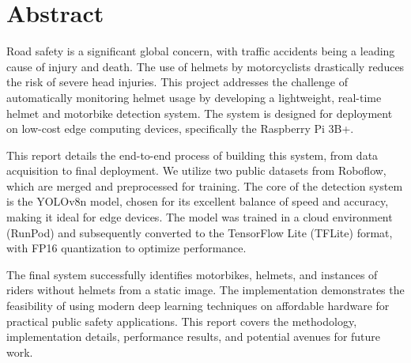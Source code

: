 \chapter*{Abstract}
Road safety is a significant global concern, with traffic accidents being a leading cause of injury and death. The use of helmets by motorcyclists drastically reduces the risk of severe head injuries. This project addresses the challenge of automatically monitoring helmet usage by developing a lightweight, real-time helmet and motorbike detection system. The system is designed for deployment on low-cost edge computing devices, specifically the Raspberry Pi 3B+.

This report details the end-to-end process of building this system, from data acquisition to final deployment. We utilize two public datasets from Roboflow, which are merged and preprocessed for training. The core of the detection system is the YOLOv8n model, chosen for its excellent balance of speed and accuracy, making it ideal for edge devices. The model was trained in a cloud environment (RunPod) and subsequently converted to the TensorFlow Lite (TFLite) format, with FP16 quantization to optimize performance.

The final system successfully identifies motorbikes, helmets, and instances of riders without helmets from a static image. The implementation demonstrates the feasibility of using modern deep learning techniques on affordable hardware for practical public safety applications. This report covers the methodology, implementation details, performance results, and potential avenues for future work.
